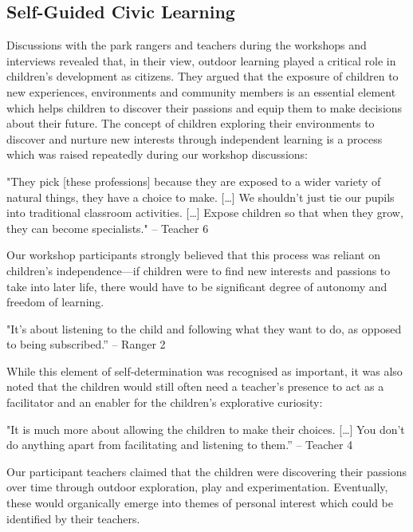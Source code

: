 \subsection{Self-Guided Civic Learning}

Discussions with the park rangers and teachers during the workshops and interviews revealed that, in their view, outdoor learning played a critical role in children’s development as citizens. They argued that the exposure of children to new experiences, environments and community members is an essential element which helps children to discover their passions and equip them to make decisions about their future. The concept of children exploring their environments to discover and nurture new interests through independent learning is a process which was raised repeatedly during our workshop discussions:

\begin{displayquote}
"They pick [these professions] because they are exposed to a wider variety of natural things, they have a choice to make. […] We shouldn’t just tie our pupils into traditional classroom activities. […] Expose children so that when they grow, they can become specialists." – Teacher 6
\end{displayquote}

Our workshop participants strongly believed that this process was reliant on children’s independence—if children were to find new interests and passions to take into later life, there would have to be significant degree of autonomy and freedom of learning. 

\begin{displayquote}
"It's about listening to the child and following what they want to do, as opposed to being subscribed.” – Ranger 2
\end{displayquote}

While this element of self-determination was recognised as important, it was also noted that the children would still often need a teacher’s presence to act as a facilitator and an enabler for the children’s explorative curiosity:

\begin{displayquote}
"It is much more about allowing the children to make their choices. […] You don’t do anything apart from facilitating and listening to them.” – Teacher 4
\end{displayquote}

Our participant teachers claimed that the children were discovering their passions over time through outdoor exploration, play and experimentation. Eventually, these would organically emerge into themes of personal interest which could be identified by their teachers.

